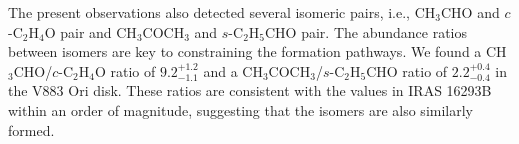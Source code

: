 \documentclass[linenumbers, twocolumn, twocolappendix, astrosymb, times]{aastex631}
\newcommand{\methanol}{CH$_3$OH\xspace}
\newcommand{\acetaldehyde}{CH$_3$CHO\xspace}
\newcommand{\methylformate}{CH$_3$OCHO\xspace}
\newcommand{\acetone}{CH$_3$COCH$_3$\xspace}
\newcommand{\ethyleneoxide}{$c$-C$_2$H$_4$O\xspace}
\newcommand{\propanal}{$s$-C$_2$H$_5$CHO\xspace}
\begin{document}

The present observations also detected several isomeric pairs, i.e., \acetaldehyde and \ethyleneoxide pair and \acetone and \propanal pair. The abundance ratios between isomers are key to constraining the formation pathways. We found a \acetaldehyde/\ethyleneoxide ratio of $9.2_{-1.1}^{+1.2}$ and a \acetone/\propanal ratio of $2.2_{-0.4}^{+0.4}$ in the V883 Ori disk. These ratios are consistent with the values in IRAS 16293B \citep{Lykke2017} within an order of magnitude, suggesting that the isomers are also similarly formed.  


\end{document}
